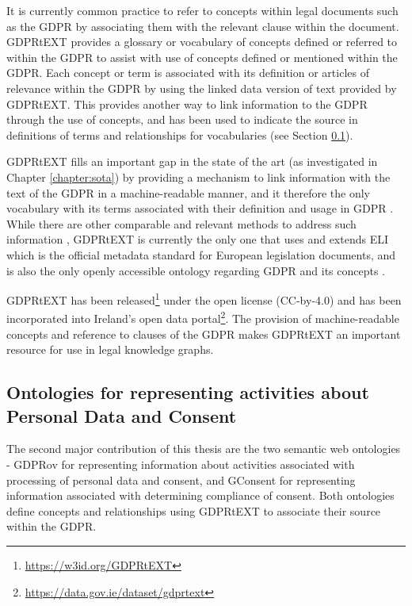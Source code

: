It is currently common practice to refer to concepts within legal documents such as the GDPR by associating them with the relevant clause within the document. 
GDPRtEXT provides a glossary or vocabulary of concepts defined or referred to within the GDPR to assist with use of concepts defined or mentioned within the GDPR. Each concept or term is associated with its definition or articles of relevance within the GDPR by using the linked data version of text provided by GDPRtEXT. This provides another way to link information to the GDPR through the use of concepts, and has been used to indicate the source in definitions of terms and relationships for vocabularies (see Section \ref{sec:contributions:ontologies}).

GDPRtEXT fills an important gap in the state of the art (as investigated in Chapter \ref{chapter:sota}) by providing a mechanism to link information with the text of the GDPR in a machine-readable manner, and it therefore the only vocabulary with its terms associated with their definition and usage in GDPR .
While there are other comparable and relevant methods to address such information \cite{agarwal_legislative_2018,palmirani_pronto:_2018-1}, GDPRtEXT is currently the only one  that uses and extends ELI \cite{noauthor_council_2012} which is the official metadata standard for European legislation documents, and is also the only openly accessible ontology regarding GDPR and its concepts \cite{leone_taking_2019}.

GDPRtEXT has been released\footnote{\url{https://w3id.org/GDPRtEXT}} under the open license (CC-by-4.0) and has been incorporated into Ireland's open data portal\footnote{\url{https://data.gov.ie/dataset/gdprtext}}.
The provision of machine-readable concepts and reference to clauses of the GDPR makes GDPRtEXT an important resource for use in legal knowledge graphs.

\subsection{Ontologies for representing activities about Personal Data and Consent}\label{sec:contributions:ontologies}
The second major contribution of this thesis are the two semantic web ontologies - GDPRov for representing information about activities associated with processing of personal data and consent, and GConsent for representing information associated with determining compliance of consent. Both ontologies define concepts and relationships using GDPRtEXT to associate their source within the GDPR.

